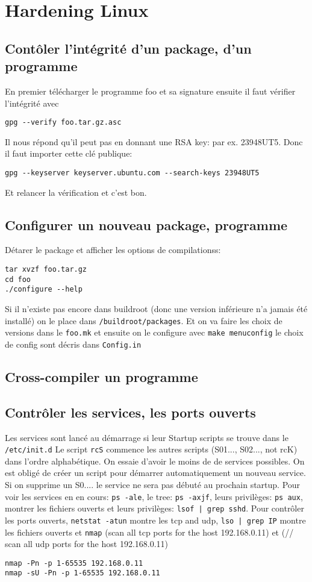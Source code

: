 \section{Hardening Linux}
\subsection{Contôler l'intégrité d'un package, d'un programme}
En premier télécharger le programme foo et sa signature ensuite il faut vérifier l'intégrité avec
\begin{lstlisting}[style=bash]
gpg --verify foo.tar.gz.asc
\end{lstlisting}
Il nous répond qu'il peut pas en donnant une RSA key: par ex. 23948UT5. Donc il faut importer cette clé publique:
\begin{lstlisting}[style=bash]
gpg --keyserver keyserver.ubuntu.com --search-keys 23948UT5
\end{lstlisting}
Et relancer la vérification et c'est bon.
\subsection{Configurer un nouveau package, programme}
Détarer le package et afficher les options de compilationss:
\begin{lstlisting}[style=bash]
tar xvzf foo.tar.gz
cd foo
./configure --help
\end{lstlisting}
Si il n'existe pas encore dans buildroot (donc une version inférieure n'a jamais été installé) on le place dans \verb!/buildroot/packages!.
Et on va faire les choix de versions dans le \verb!foo.mk! et ensuite on le configure avec \verb!make menuconfig! le choix de config sont décris dans \verb!Config.in!

\subsection{Cross-compiler un programme}

\subsection{Contrôler les services, les ports ouverts}
Les services sont lancé au démarrage si leur Startup scripts se trouve dans le \verb!/etc/init.d!
Le script \verb!rcS! commence les autres scripts (S01..., S02..., not rcK) dans l'ordre alphabétique. On essaie d'avoir le moins de de services possibles. On est obligé de créer un script pour démarrer automatiquement un nouveau service. Si on supprime un S0.... le service ne sera pas débuté au prochain startup. Pour voir les services en en cours: \verb!ps -ale!, le tree: \verb!ps -axjf!, leurs privilèges: \verb!ps aux!, montrer les fichiers ouverts et leurs privilèges: \verb!lsof | grep sshd!. Pour contrôler les ports ouverts, \verb!netstat -atun! montre les tcp and udp, \verb!lso | grep IP! montre les fichiers ouverts et \verb!nmap! (scan all tcp ports for the host 192.168.0.11) et (// scan all udp ports for the host 192.168.0.11)
\begin{lstlisting}[style=bash]
nmap -Pn -p 1-65535 192.168.0.11 
nmap -sU -Pn -p 1-65535 192.168.0.11 
\end{lstlisting}

